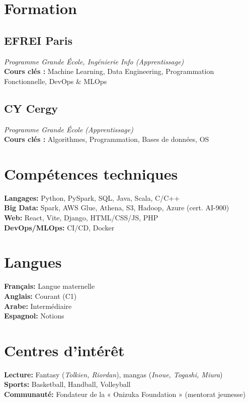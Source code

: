 \documentclass[]{deedy-resume-reversed}
\begin{document}
\begin{minipage}[t]{0.33\textwidth}

\section{Formation}

\subsection{EFREI Paris}
\textit{Programme Grande École, Ingénierie Info (Apprentissage)} \\
\textbf{Cours clés :} Machine Learning, Data Engineering, Programmation Fonctionnelle, DevOps \& MLOps
\sectionsep

\subsection{CY Cergy}
\textit{Programme Grande École (Apprentissage)} \\
\textbf{Cours clés :} Algorithmes, Programmation, Bases de données, OS
\sectionsep

\section{Compétences techniques}
\textbf{Langages:} Python, PySpark, SQL, Java, Scala, C/C++ \\
\textbf{Big Data:} Spark, AWS Glue, Athena, S3, Hadoop, Azure (cert. AI-900) \\
\textbf{Web:} React, Vite, Django, HTML/CSS/JS, PHP \\
\textbf{DevOps/MLOps:} CI/CD, Docker
\sectionsep

\section{Langues}
\textbf{Français:} Langue maternelle \\
\textbf{Anglais:} Courant (C1) \\
\textbf{Arabe:} Intermédiaire \\
\textbf{Espagnol:} Notions
\sectionsep

\section{Centres d’intérêt}
\textbf{Lecture:} Fantasy (\textit{Tolkien, Riordan}), mangas (\textit{Inoue, Togashi, Miura}) \\
\textbf{Sports:} Basketball, Handball, Volleyball \\
\textbf{Communauté:} Fondateur de la « Onizuka Foundation » (mentorat jeunesse)
\sectionsep

\end{minipage}
\end{document}
